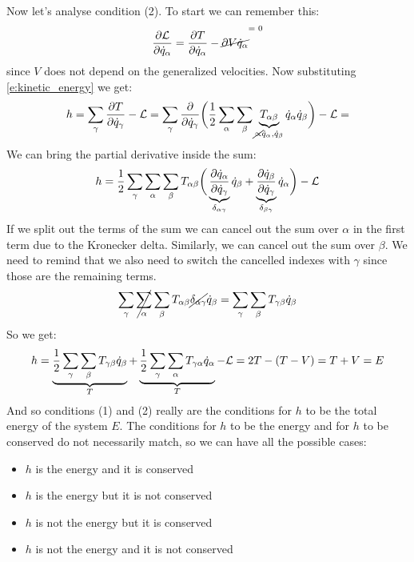 Now let's analyse condition (2). To start we can remember this:
\begin{equation}
    \pdv{\lagr}{\dot{q}_{\alpha}} = \dfrac{\partial T}{\partial \dot{q}_{\alpha}} - \crossout{\partial{V}{\dot{q}_{\alpha}}}
\end{equation}
since $V$ does not depend on the generalized velocities. Now substituting \eqref{e:kinetic_energy} we get:
\begin{equation}
    h = \displaystyle\sum_{\gamma}\dfrac{\partial T}{\partial \dot{q}_{\gamma}} - \mathcal{L} = \displaystyle\sum_{\gamma}\dfrac{\partial}{\partial \dot{q}_{\gamma}}\bigg(\dfrac{1}{2}\displaystyle\sum_{\alpha}\displaystyle\sum_{\beta}\underbrace{T_{\alpha \beta}}_{\cancel{\propto} \dot{q}_{\alpha}, \dot{q}_{\beta}}\dot{q}_{\alpha}\dot{q}_{\beta}\bigg)  - \mathcal{L} =
\end{equation}
We can bring the partial derivative inside the sum:
\begin{equation}
    h = \dfrac{1}{2}\displaystyle\sum_{\gamma}\displaystyle\sum_{\alpha}\displaystyle\sum_{\beta}T_{\alpha \beta}\bigg(\underbrace{\dfrac{\partial \dot{q}_{\alpha}}{\partial \dot{q}_{\gamma}}}_{\delta_{\alpha \gamma}}\dot{q}_{\beta} + \underbrace{\dfrac{\partial \dot{q}_{\beta}}{\partial \dot{q}_{\gamma}}}_{\delta_{\beta \gamma}}\dot{q}_{\alpha}\bigg) - \mathcal{L}
\end{equation}
If we split out the terms of the sum we can cancel out the sum over $\alpha$ in the first term due to the Kronecker delta. Similarly, we can cancel out the sum over $\beta$. We need to remind that we also need to switch the cancelled indexes with $\gamma$ since those are the remaining terms.
\begin{equation}
    \displaystyle\sum_{\gamma}\cancel{\displaystyle\sum_{\alpha}}\displaystyle\sum_{\beta}T_{\alpha \beta }\cancel{\delta_{\alpha \gamma}}\dot{q}_{\beta} = \displaystyle\sum_{\gamma}\displaystyle\sum_{\beta}T_{\gamma \beta }\dot{q}_{\beta}
\end{equation}
So we get:
\begin{equation}
    h = \underbrace{\dfrac{1}{2}\displaystyle\sum_{\gamma}\displaystyle\sum_{\beta}T_{\gamma \beta }\dot{q}_{\beta}}_{T} + \underbrace{\dfrac{1}{2}\displaystyle\sum_{\gamma}\displaystyle\sum_{\alpha}T_{\gamma \alpha }\dot{q}_{\alpha}}_{T} - \mathcal{L} = 2T - (T-V) = T + V = E
\end{equation}
And so conditions (1) and (2) really are the conditions for $h$ to be the total energy of the system $E$. The conditions for $h$ to be the energy and for $h$ to be conserved do not necessarily match, so we can have all the possible cases:
\begin{itemize}
    \item $h$ is the energy and it is conserved
    \item $h$ is the energy but it is not conserved
    \item $h$ is not the energy but it is conserved
    \item $h$ is not the energy and it is not conserved
\end{itemize}
